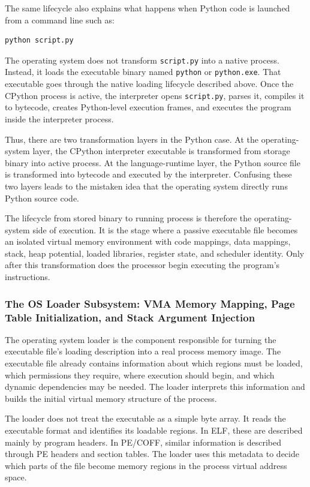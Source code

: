 The same lifecycle also explains what happens when Python code is launched from a command line such as:

\begin{verbatim}
python script.py
\end{verbatim}

The operating system does not transform \texttt{script.py} into a native process. Instead, it loads the executable binary named \texttt{python} or \texttt{python.exe}. That executable goes through the native loading lifecycle described above. Once the CPython process is active, the interpreter opens \texttt{script.py}, parses it, compiles it to bytecode, creates Python-level execution frames, and executes the program inside the interpreter process.

Thus, there are two transformation layers in the Python case. At the operating-system layer, the CPython interpreter executable is transformed from storage binary into active process. At the language-runtime layer, the Python source file is transformed into bytecode and executed by the interpreter. Confusing these two layers leads to the mistaken idea that the operating system directly runs Python source code.

The lifecycle from stored binary to running process is therefore the operating-system side of execution. It is the stage where a passive executable file becomes an isolated virtual memory environment with code mappings, data mappings, stack, heap potential, loaded libraries, register state, and scheduler identity. Only after this transformation does the processor begin executing the program's instructions.


\subsubsection{The OS Loader Subsystem: VMA Memory Mapping, Page Table Initialization, and Stack Argument Injection}

The operating system loader is the component responsible for turning the executable file's loading description into a real process memory image. The executable file already contains information about which regions must be loaded, which permissions they require, where execution should begin, and which dynamic dependencies may be needed. The loader interprets this information and builds the initial virtual memory structure of the process.

The loader does not treat the executable as a simple byte array. It reads the executable format and identifies its loadable regions. In ELF, these are described mainly by program headers. In PE/COFF, similar information is described through PE headers and section tables. The loader uses this metadata to decide which parts of the file become memory regions in the process virtual address space.

